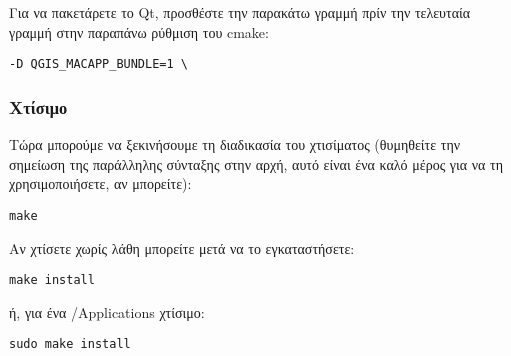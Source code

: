Για να πακετάρετε το Qt, προσθέστε την παρακάτω γραμμή πρίν την τελευταία γραμμή στην παραπάνω ρύθμιση του cmake:

\begin{verbatim}
-D QGIS_MACAPP_BUNDLE=1 \
\end{verbatim}

\hypertarget{toc25}{}
\subsubsection{Χτίσιμο}
Τώρα μπορούμε να ξεκινήσουμε τη διαδικασία του χτισίματος (θυμηθείτε την σημείωση της παράλληλης σύνταξης στην αρχή, αυτό είναι ένα καλό μέρος για να τη χρησιμοποιήσετε, αν μπορείτε):

\begin{verbatim}
make 
\end{verbatim}

Αν χτίσετε χωρίς λάθη μπορείτε μετά να το εγκαταστήσετε:

\begin{verbatim}
make install 
\end{verbatim}

ή, για ένα /Applications χτίσιμο:

\begin{verbatim}
sudo make install
\end{verbatim}

